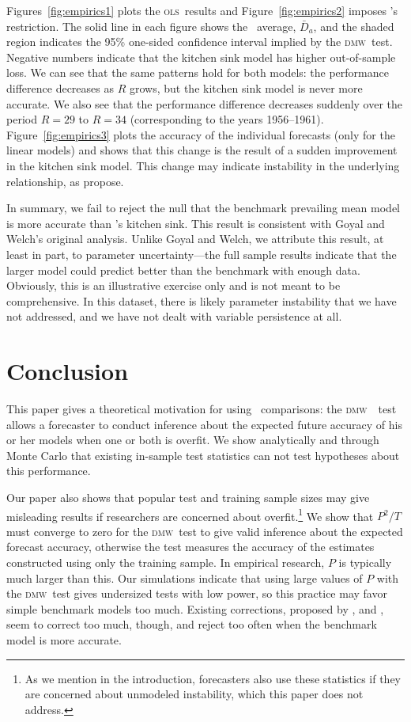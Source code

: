\documentclass[11pt]{article}
\newcommand{\citepos}[1]{\citeauthor{#1}'s \citeyearpar{#1}}
\newcommand{\oosA}{\bar{D}_a}
\newcommand{\dmw}{\textsc{dmw}}
\newcommand{\ols}{\textsc{ols}}
\begin{document}
Figures~\ref{fig:empirics1} plots the \ols\ results and
Figure~\ref{fig:empirics2} imposes \citepos{CaT:08} restriction.  The
solid line in each figure shows the \oos\ average, $\oosA$, and the
shaded region indicates the 95\% one-sided confidence interval implied
by the \dmw\ test.  Negative numbers indicate that the kitchen sink
model has higher out-of-sample loss.  We can see that the same
patterns hold for both models: the performance difference decreases as
$R$ grows, but the kitchen sink model is never more accurate.  We also
see that the performance difference decreases suddenly over the period
$R=29$ to $R=34$ (corresponding to the years 1956--1961).
Figure~\ref{fig:empirics3} plots the accuracy of the individual
forecasts (only for the linear models) and shows that this change is
the result of a sudden improvement in the kitchen sink model.  This
change may indicate instability in the underlying relationship, as
\citet{GoW:08} propose.

In summary, we fail to reject the null that the benchmark prevailing
mean model is more accurate than \citepos{GoW:08} kitchen sink.  This
result is consistent with Goyal and Welch's original analysis.  Unlike
Goyal and Welch, we attribute this result, at least in part, to
parameter uncertainty---the full sample results indicate that the
larger model could predict better than the benchmark with enough data.
Obviously, this is an illustrative exercise only and is not meant to
be comprehensive.  In this dataset, there is likely parameter
instability that we have not addressed, and we have not dealt with
variable persistence at all.
\section{Conclusion}\label{sec:conclusion}
This paper gives a theoretical motivation for using \oos\ comparisons:
the \dmw\ \oos\ test allows a forecaster to conduct inference about
the expected future accuracy of his or her models when one or both is
overfit.  We show analytically and through Monte Carlo that existing
in-sample test statistics can not test hypotheses about this
performance.

Our paper also shows that popular test and training sample sizes may
give misleading results if researchers are concerned about
overfit.\footnote{As we mention in the introduction, forecasters also
  use these statistics if they are concerned about unmodeled
  instability, which this paper does not address.}  We show that
$P^2/T$ must converge to zero for the \dmw\ test to give valid
inference about the expected forecast accuracy, otherwise the test
measures the accuracy of the estimates constructed using only the
training sample.  In empirical research, $P$ is typically much larger
than this.  Our simulations indicate that using large values of $P$
with the \dmw\ test gives undersized tests with low power, so this
practice may favor simple benchmark models too much.  Existing
corrections, proposed by \citet{ClM:01,ClM:05}, \citet{Mcc:07} and
\citet{ClW:06,ClW:07}, seem to correct too much, though, and reject
too often when the benchmark model is more accurate.
\end{document}
